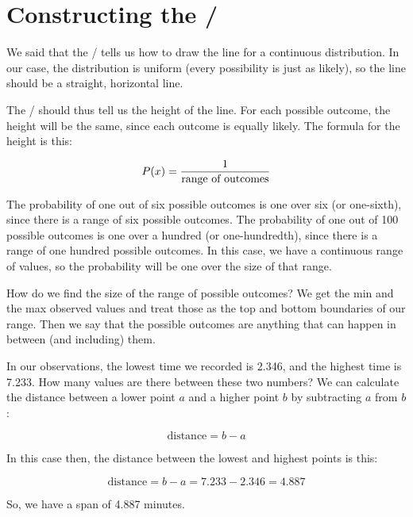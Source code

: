 \documentclass[../../../main.tex]{subfiles}
\begin{document}
\section{Constructing the \PDFtext/}

We said that the \PDFtext/ tells us how to draw the line for a continuous distribution. In our case, the distribution is uniform (every possibility is just as likely), so the line should be a straight, horizontal line.

The \PDFtext/ should thus tell us the height of the line. For each possible outcome, the height will be the same, since each outcome is equally likely. The formula for the height is this:

\begin{equation*}
  \Probability{\RandVarVal/} = \frac{1}{\text{range of outcomes}}
\end{equation*}

\noindent
The probability of one out of six possible outcomes is one over six (or one-sixth), since there is a range of six possible outcomes. The probability of one out of 100 possible outcomes is one over a hundred (or one-hundredth), since there is a range of one hundred possible outcomes. In this case, we have a continuous range of values, so the probability will be one over the size of that range.

How do we find the size of the range of possible outcomes? We get the min and the max observed values and treat those as the top and bottom boundaries of our range. Then we say that the possible outcomes are anything that can happen in between (and including) them.

In our observations, the lowest time we recorded is 2.346, and the highest time is 7.233. How many values are there between these two numbers? We can calculate the distance between a lower point $a$ and a higher point $b$ by subtracting $a$ from $b$:

\begin{equation*}
  \text{distance} = b - a
\end{equation*}

\noindent
In this case then, the distance between the lowest and highest points is this:

\begin{equation*}
  \text{distance} = b - a = 7.233 - 2.346 = 4.887
\end{equation*}

\noindent
So, we have a span of 4.887 minutes.
\end{document}
